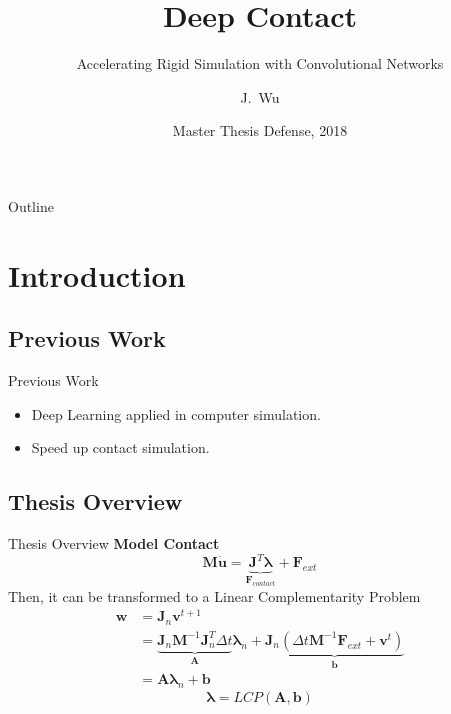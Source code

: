 \documentclass{beamer}
\title{Deep Contact}
\subtitle{Accelerating Rigid Simulation with Convolutional Networks}
\author{J.~Wu}
\institute[University of Copenhagen] %
{
  Department of Computer Science\\
  University of Copenhagen
}
\date{Master Thesis Defense, 2018}
\begin{document}
\begin{frame}
  \titlepage
\end{frame}

\begin{frame}{Outline}
  \tableofcontents
\end{frame}

\section{Introduction}

\subsection{Previous Work}

\begin{frame}{Previous Work}
  \begin{itemize}
  \item {
    Deep Learning applied in computer simulation.
  }
  \item {
    Speed up contact simulation.
  }
  \end{itemize}
\end{frame}

\subsection{Thesis Overview}
\begin{frame}{Thesis Overview}
\pause
\textbf{Model Contact}
\pause
$$\pmb{M}\dot{\mathbf{u}} = \underbrace{\pmb{J}^{T}\pmb{\lambda}}_{\mathbf{F}_{contact}} + \mathbf{F}_{ext}$$
\pause
Then, it can be transformed to a Linear Complementarity Problem
\pause
\begin{equation*}
    \begin{aligned}
        \mathbf{w} & = \pmb{J}_{n}\mathbf{v}^{t+1} \\
        & =  \underbrace{\pmb{J}_{n}\pmb{M}^{-1}\pmb{J}_{n}^{T}\Delta{t}}_{\pmb{A}}\pmb{\lambda}_{n} + \underbrace{\pmb{J}_{n}(\Delta{t}\pmb{M}^{-1}\mathbf{F}_{ext} + \mathbf{v}^{t})}_{\pmb{b}} \\
        & = \pmb{A}\pmb{\lambda}_{n} + \pmb{b}
    \end{aligned}
\end{equation*}
\pause
$$\pmb{\lambda} = \textit{LCP}(\pmb{A}, \pmb{b})$$
\end{frame}
\end{document}
